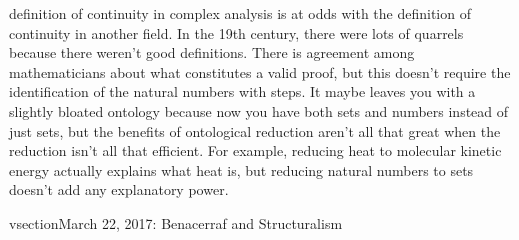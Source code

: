 \documentclass[12pt]{article}
\theoremstyle{definition}
\begin{document}
\begin{itemize}
        definition of continuity in complex analysis is at odds with the
        definition of continuity in another field. In the 19th century, there
        were lots of quarrels because there weren't good definitions. There is
        agreement among mathematicians about what constitutes a valid proof,
        but this doesn't require the identification of the natural numbers with
        steps. It maybe leaves you with a slightly bloated ontology because now
        you have both sets and numbers instead of just sets, but the benefits
        of ontological reduction aren't all that great when the reduction isn't
        all that efficient. For example, reducing heat to molecular kinetic
        energy actually explains what heat is, but reducing natural numbers to
        sets doesn't add any explanatory power. 

\end{itemize}

vsection{March 22, 2017: Benacerraf and Structuralism}
\end{document}

